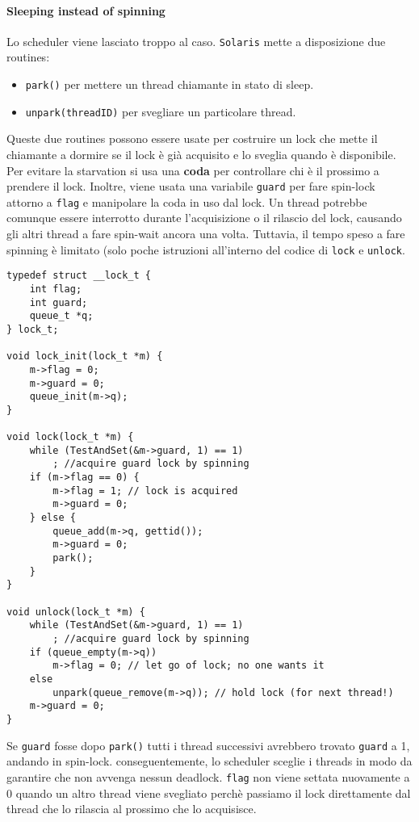 \documentclass[12pt, twoside, letterpaper]{article}
\begin{document}
				\paragraph{Sleeping instead of spinning} Lo scheduler viene lasciato troppo al caso. \texttt{Solaris} mette a disposizione due routines:
				\begin{itemize}
					\item \texttt{park()} per mettere un thread chiamante in stato di sleep.
					\item \texttt{unpark(threadID)} per svegliare un particolare thread.
				\end{itemize}
				Queste due routines possono essere usate per costruire un lock che mette il chiamante a dormire se il lock è già acquisito e lo sveglia quando è disponibile. Per evitare la starvation si usa una \textbf{coda} per controllare chi è il prossimo a prendere il lock. Inoltre, viene usata una variabile \texttt{guard} per fare spin-lock attorno a \texttt{flag} e manipolare la coda in uso dal lock. Un thread potrebbe comunque essere interrotto durante l'acquisizione o il rilascio del lock, causando gli altri thread a fare spin-wait ancora una volta. Tuttavia, il tempo speso a fare spinning è limitato (solo poche istruzioni all'interno del codice di \texttt{lock} e \texttt{unlock}.
				
				\begin{lstlisting}[style=CStyle]
typedef struct __lock_t {
	int flag;
	int guard;
	queue_t *q;
} lock_t;

void lock_init(lock_t *m) {
	m->flag = 0;
	m->guard = 0;
	queue_init(m->q);
}

void lock(lock_t *m) {
	while (TestAndSet(&m->guard, 1) == 1)
		; //acquire guard lock by spinning
	if (m->flag == 0) {
		m->flag = 1; // lock is acquired
		m->guard = 0;
	} else {
		queue_add(m->q, gettid());
		m->guard = 0;
		park();
	}
}

void unlock(lock_t *m) {
	while (TestAndSet(&m->guard, 1) == 1)
		; //acquire guard lock by spinning
	if (queue_empty(m->q))
		m->flag = 0; // let go of lock; no one wants it
	else
		unpark(queue_remove(m->q)); // hold lock (for next thread!)
	m->guard = 0;
}				\end{lstlisting}				
				
				Se \texttt{guard} fosse dopo \texttt{park()} tutti i thread successivi avrebbero trovato \texttt{guard} a 1, andando in spin-lock.
				conseguentemente, lo scheduler sceglie i threads in modo da garantire che non avvenga nessun
deadlock.
				\texttt{flag} non viene settata nuovamente a 0 quando un altro thread viene svegliato perchè passiamo il lock direttamente dal thread che lo rilascia al prossimo che lo acquisisce. 
				
\end{document}
